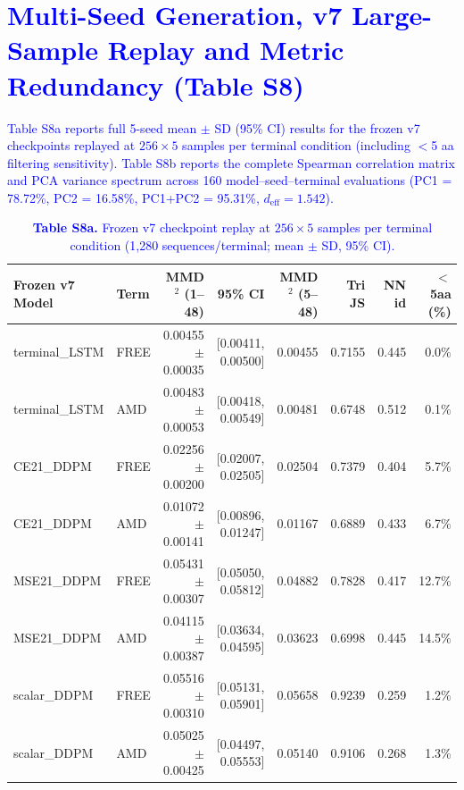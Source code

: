 \documentclass[11pt,a4paper]{article}
\newcommand{\rev}[1]{\textcolor{blue}{#1}}
\begin{document}
\FloatBarrier
\section{\rev{Multi-Seed Generation, v7 Large-Sample Replay and Metric Redundancy (Table S8)}}
\rev{Table S8a reports full 5-seed mean $\pm$ SD (95\% CI) results for the frozen v7 checkpoints replayed at $256\times 5$ samples per terminal condition (including $<$5 aa filtering sensitivity). Table S8b reports the complete Spearman correlation matrix and PCA variance spectrum across 160 model--seed--terminal evaluations (PC1 = 78.72\%, PC2 = 16.58\%, PC1+PC2 = 95.31\%, $d_{\mathrm{eff}}=1.542$).}

\begin{table}[H]
\centering\footnotesize\setlength{\tabcolsep}{4.2pt}
\caption*{\rev{\textbf{Table S8a.} Frozen v7 checkpoint replay at $256\times 5$ samples per terminal condition (1,280 sequences/terminal; mean $\pm$ SD, 95\% CI).}}
\begin{tabular}{llrrrrrr}
\toprule
Frozen v7 Model & Term & MMD$^2$ (1--48) & 95\% CI & MMD$^2$ (5--48) & Tri JS & NN id & $<$5aa (\%) \\
\midrule
terminal\_LSTM & FREE & 0.00455$\pm$0.00035 & [0.00411, 0.00500] & 0.00455 & 0.7155 & 0.445 & 0.0\% \\
terminal\_LSTM & AMD & 0.00483$\pm$0.00053 & [0.00418, 0.00549] & 0.00481 & 0.6748 & 0.512 & 0.1\% \\
CE21\_DDPM & FREE & 0.02256$\pm$0.00200 & [0.02007, 0.02505] & 0.02504 & 0.7379 & 0.404 & 5.7\% \\
CE21\_DDPM & AMD & 0.01072$\pm$0.00141 & [0.00896, 0.01247] & 0.01167 & 0.6889 & 0.433 & 6.7\% \\
MSE21\_DDPM & FREE & 0.05431$\pm$0.00307 & [0.05050, 0.05812] & 0.04882 & 0.7828 & 0.417 & 12.7\% \\
MSE21\_DDPM & AMD & 0.04115$\pm$0.00387 & [0.03634, 0.04595] & 0.03623 & 0.6998 & 0.445 & 14.5\% \\
scalar\_DDPM & FREE & 0.05516$\pm$0.00310 & [0.05131, 0.05901] & 0.05658 & 0.9239 & 0.259 & 1.2\% \\
scalar\_DDPM & AMD & 0.05025$\pm$0.00425 & [0.04497, 0.05553] & 0.05140 & 0.9106 & 0.268 & 1.3\% \\
\bottomrule
\end{tabular}
\end{table}
\end{document}
